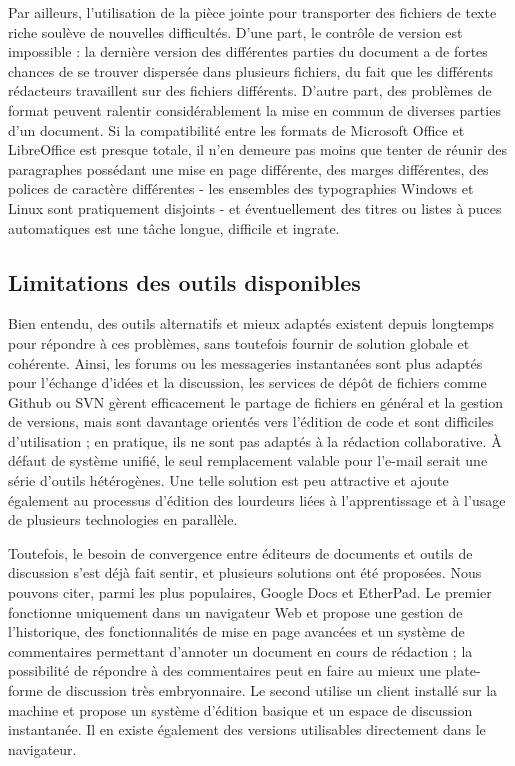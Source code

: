 \documentclass[10pt,twocolumn,a4paper,utf8x]{article}
\begin{document}
Par ailleurs, l'utilisation de la pièce jointe pour transporter des
fichiers de texte riche soulève de nouvelles difficultés. D'une part, le
contrôle de version est impossible : la dernière version des différentes
parties du document a de fortes chances de se trouver dispersée dans
plusieurs fichiers, du fait que les différents rédacteurs travaillent
sur des fichiers différents. D'autre part, des problèmes de format
peuvent ralentir considérablement la mise en commun de diverses parties
d'un document. Si la compatibilité entre les formats de Microsoft Office
et LibreOffice est presque totale, il n'en demeure pas moins que tenter
de réunir des paragraphes possédant une mise en page différente, des
marges différentes, des polices de caractère différentes - les ensembles
des typographies Windows et Linux sont pratiquement disjoints - et
éventuellement des titres ou listes à puces automatiques est une tâche
longue, difficile et ingrate.

\subsection{Limitations des outils disponibles}

Bien entendu, des outils alternatifs et mieux adaptés existent depuis
longtemps pour répondre à ces problèmes, sans toutefois fournir de
solution globale et cohérente. Ainsi, les forums ou les messageries
instantanées sont plus adaptés pour l'échange d'idées et la discussion,
les services de dépôt de fichiers comme Github ou SVN gèrent
efficacement le partage de fichiers en général et la gestion de
versions, mais sont davantage orientés vers l'édition de code et sont
difficiles d'utilisation ; en pratique, ils ne sont pas adaptés à la
rédaction collaborative. À défaut de système unifié, le seul
remplacement valable pour l'e-mail serait une série d'outils
hétérogènes. Une telle solution est peu attractive et ajoute également
au processus d'édition des lourdeurs liées à l'apprentissage et à
l'usage de plusieurs technologies en parallèle.

Toutefois, le besoin de convergence entre éditeurs de documents et
outils de discussion s'est déjà fait sentir, et plusieurs solutions ont
été proposées. Nous pouvons citer, parmi les plus populaires, Google
Docs et EtherPad. Le premier fonctionne uniquement dans un navigateur
Web et propose une gestion de l'historique, des fonctionnalités de mise
en page avancées et un système de commentaires permettant d'annoter un
document en cours de rédaction ; la possibilité de répondre à des
commentaires peut en faire au mieux une plate-forme de discussion très
embryonnaire. Le second utilise un client installé sur la machine et
propose un système d'édition basique et un espace de discussion
instantanée. Il en existe également des versions utilisables directement
dans le navigateur.
\end{document}
